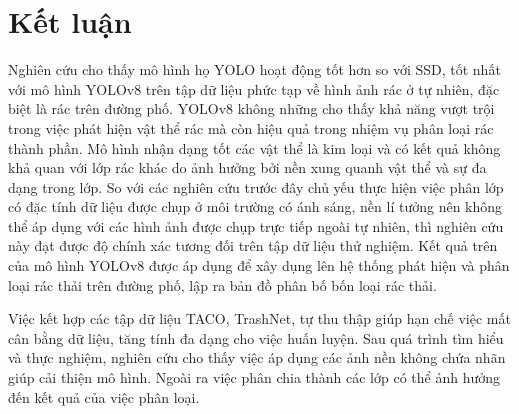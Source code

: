 \documentclass[../the.tex]{subfiles}
\begin{document}
\section{Kết luận}

{\fontsize{13}{12} \selectfont

Nghiên cứu cho thấy mô hình họ YOLO hoạt động tốt hơn so với SSD, tốt nhất với mô hình YOLOv8 trên tập dữ liệu phức tạp về hình ảnh rác ở tự nhiên, đặc biệt là rác trên đường phố.
YOLOv8 không những cho thấy khả năng vượt trội trong việc phát hiện vật thể rác mà còn hiệu quả trong nhiệm vụ phân loại rác thành phần.
Mô hình nhận dạng tốt các vật thể là kim loại và có kết quả không khả quan với lớp rác khác do ảnh hưởng bởi nền xung quanh vật thể và sự đa dạng trong lớp.
So với các nghiên cứu trước đây chủ yếu thực hiện việc phân lớp có đặc tính dữ liệu được chụp ở môi trường có ánh sáng, nền lí tưởng nên không thể áp dụng với các hình ảnh được chụp trực tiếp ngoài tự nhiên, thì nghiên cứu này đạt được độ chính xác tương đối trên tập dữ liệu thử nghiệm.
Kết quả trên của mô hình YOLOv8 được áp dụng để xây dụng lên hệ thống phát hiện và phân loại rác thải trên đường phố, lập ra bản đồ phân bố bốn loại rác thải.

}

\bigskip

{\fontsize{13}{12} \selectfont 
Việc kết hợp các tập dữ liệu TACO, TrashNet, tự thu thập giúp hạn chế việc mất cân bằng dữ liệu, tăng tính đa dạng cho việc huấn luyện.
Sau quá trình tìm hiểu và thực nghiệm, nghiên cứu cho thấy việc áp dụng các ảnh nền không chứa nhãn giúp cải thiện mô hình. Ngoài ra việc phân chia thành các lớp có thể ảnh hưởng đến kết quả của việc phân loại.

}
\end{document}
